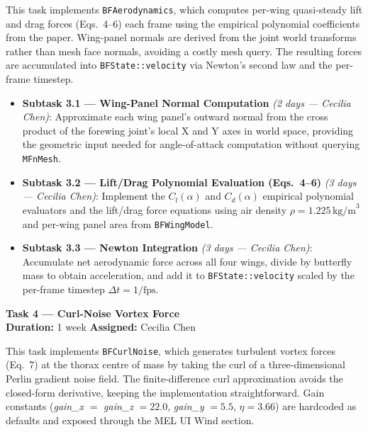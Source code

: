 \documentclass[12pt]{article}
\begin{document}
This task implements \texttt{BFAerodynamics}, which computes per-wing quasi-steady
lift and drag forces (Eqs.~4--6) each frame using the empirical polynomial
coefficients from the paper. Wing-panel normals are derived from the joint world
transforms rather than mesh face normals, avoiding a costly mesh query. The
resulting forces are accumulated into \texttt{BFState::velocity} via Newton's second
law and the per-frame timestep.

\begin{itemize}
  \item \textbf{Subtask 3.1 --- Wing-Panel Normal Computation} \textit{(2 days --- Cecilia Chen)}: Approximate each
    wing panel's outward normal from the cross product of the forewing joint's local
    X and Y axes in world space, providing the geometric input needed for
    angle-of-attack computation without querying \texttt{MFnMesh}.
  \item \textbf{Subtask 3.2 --- Lift/Drag Polynomial Evaluation (Eqs.~4--6)} \textit{(3 days --- Cecilia Chen)}:
    Implement the $C_l(\alpha)$ and $C_d(\alpha)$ empirical polynomial evaluators
    and the lift/drag force equations using air density $\rho=1.225\,\text{kg/m}^3$
    and per-wing panel area from \texttt{BFWingModel}.
  \item \textbf{Subtask 3.3 --- Newton Integration} \textit{(3 days --- Cecilia Chen)}: Accumulate net aerodynamic
    force across all four wings, divide by butterfly mass to obtain acceleration,
    and add it to \texttt{BFState::velocity} scaled by the per-frame timestep
    $\Delta t = 1/\text{fps}$.
\end{itemize}

\bigskip
\noindent\textbf{Task 4 --- Curl-Noise Vortex Force}\\
\textbf{Duration:} 1 week \quad \textbf{Assigned:} Cecilia Chen

This task implements \texttt{BFCurlNoise}, which generates turbulent vortex forces
(Eq.~7) at the thorax centre of mass by taking the curl of a three-dimensional
Perlin gradient noise field. The finite-difference curl approximation avoids the
closed-form derivative, keeping the implementation straightforward. Gain constants
(\textit{gain\_x} $=$ \textit{gain\_z} $= 22.0$, \textit{gain\_y} $= 5.5$,
$\eta = 3.66$) are hardcoded as defaults and exposed through the MEL UI Wind section.
\end{document}

